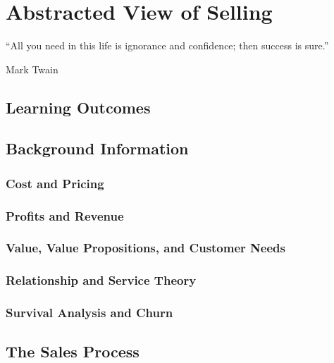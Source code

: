 \chapter{Abstracted View of Selling}
\epigraph{“All you need in this life is ignorance and confidence; then success is sure.”}{Mark Twain}

\section{Learning Outcomes}

\section{Background Information}


\subsection{Cost and Pricing}

 
\subsection{Profits and Revenue}


\subsection{Value, Value Propositions, and Customer Needs}


\subsection{Relationship and Service Theory}


\subsection{Survival Analysis and Churn}


\section{The Sales Process}
